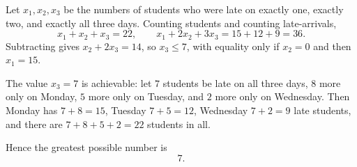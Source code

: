 Let $x_1,x_2,x_3$ be the numbers of students who were late on exactly one, exactly two, and exactly all three days. Counting students and counting late-arrivals,
\[x_1+x_2+x_3=22,\qquad x_1+2x_2+3x_3=15+12+9=36.\]
Subtracting gives $x_2+2x_3=14$, so $x_3\le 7$, with equality only if $x_2=0$ and then $x_1=15$.

The value $x_3=7$ is achievable: let $7$ students be late on all three days, $8$ more only on Monday, $5$ more only on Tuesday, and $2$ more only on Wednesday. Then Monday has $7+8=15$, Tuesday $7+5=12$, Wednesday $7+2=9$ late students, and there are $7+8+5+2=22$ students in all.

Hence the greatest possible number is
\[\boxed{7}.\]
